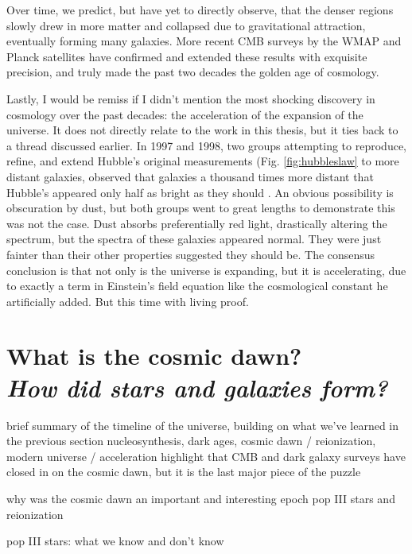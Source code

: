 Over time, we predict, but have yet to directly observe, that the denser regions slowly drew in more matter and collapsed due to gravitational attraction, eventually forming many galaxies. More recent CMB surveys by the WMAP \citep{wmap9year} and Planck \citep{planck15} satellites have confirmed and extended these results with exquisite precision, and truly made the past two decades the golden age of cosmology.


Lastly, I would be remiss if I didn't mention the most shocking discovery in cosmology over the past decades: the acceleration of the expansion of the universe. It does not directly relate to the work in this thesis, but it ties back to a thread discussed earlier. In 1997 and 1998, two groups attempting to reproduce, refine, and extend Hubble's original measurements (Fig. \ref{fig:hubbleslaw} to more distant galaxies, observed that galaxies a thousand times more distant that Hubble's appeared 
only half as bright as they should \citep{perlmutter97,riess08}. An obvious possibility is obscuration by dust, but both groups went to great lengths to demonstrate this was not the case. Dust absorbs preferentially red light, drastically altering the spectrum, but the spectra of these galaxies appeared normal. They were just fainter than their other properties suggested they should be. The consensus conclusion is that not only is the universe is expanding, but it is accelerating, due to exactly a term in Einstein's field equation like the cosmological constant he artificially added. But this time with living proof.

\section[What is the cosmic dawn? \emph{How did stars and galaxies form?}]{What is the cosmic dawn?\\ \emph{\large{How did stars and galaxies form?}}}
 
brief summary of the timeline of the universe, building on what we've learned in the previous section
nucleosynthesis, dark ages, cosmic dawn / reionization, modern universe / acceleration
highlight that CMB and dark galaxy surveys have closed in on the cosmic dawn, but it is the last major piece of the puzzle

why was the cosmic dawn an important and interesting epoch
pop III stars and reionization

pop III stars: what we know and don't know

